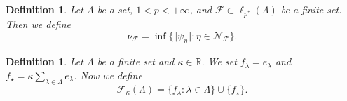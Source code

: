 \documentclass[12pt]{article}
\newtheorem{definition}[theorem]{Definition}
\begin{document}
\begin{definition}\label{ExtMorphsNormInf}
    Let $\Lambda$ be a set, $1<p<+\infty$, 
    and $\mathcal{F}\subset\ell_{p^*}(\Lambda)$ be a finite set. Then we define
    \[
        \nu_{\mathcal{F}}=\inf\{
            \Vert\psi_{\eta}\Vert : \eta\in\mathcal{N}_{\mathcal{F}}
        \}.
    \]
\end{definition}

\begin{definition}\label{SpclFuncFam}
    Let $\Lambda$ be a finite set and $\kappa\in\mathbb{R}$. We set
    $f_\lambda=e_\lambda$ 
    and $f_{\star}=\kappa\sum_{\lambda\in\Lambda} e_\lambda$. 
    Now we define
    \[
        \mathcal{F}_{\kappa}(\Lambda)
        =\{f_\lambda: \lambda\in\Lambda\}
        \cup
        \{f_\star\}.
    \]
\end{definition}
\end{document}
